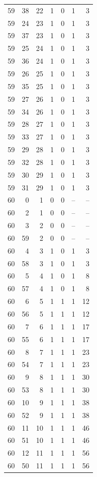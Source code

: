 \begin{longtable}{rrrrrrr}
59 & 38 & 22 & 1 & 0 & 1 & 3\\
59 & 24 & 23 & 1 & 0 & 1 & 3\\
59 & 37 & 23 & 1 & 0 & 1 & 3\\
59 & 25 & 24 & 1 & 0 & 1 & 3\\
59 & 36 & 24 & 1 & 0 & 1 & 3\\
59 & 26 & 25 & 1 & 0 & 1 & 3\\
59 & 35 & 25 & 1 & 0 & 1 & 3\\
59 & 27 & 26 & 1 & 0 & 1 & 3\\
59 & 34 & 26 & 1 & 0 & 1 & 3\\
59 & 28 & 27 & 1 & 0 & 1 & 3\\
59 & 33 & 27 & 1 & 0 & 1 & 3\\
59 & 29 & 28 & 1 & 0 & 1 & 3\\
59 & 32 & 28 & 1 & 0 & 1 & 3\\
59 & 30 & 29 & 1 & 0 & 1 & 3\\
59 & 31 & 29 & 1 & 0 & 1 & 3\\
60 & 0 & 1 & 0 & 0 & -- & --\\
60 & 2 & 1 & 0 & 0 & -- & --\\
60 & 3 & 2 & 0 & 0 & -- & --\\
60 & 59 & 2 & 0 & 0 & -- & --\\
60 & 4 & 3 & 1 & 0 & 1 & 3\\
60 & 58 & 3 & 1 & 0 & 1 & 3\\
60 & 5 & 4 & 1 & 0 & 1 & 8\\
60 & 57 & 4 & 1 & 0 & 1 & 8\\
60 & 6 & 5 & 1 & 1 & 1 & 12\\
60 & 56 & 5 & 1 & 1 & 1 & 12\\
60 & 7 & 6 & 1 & 1 & 1 & 17\\
60 & 55 & 6 & 1 & 1 & 1 & 17\\
60 & 8 & 7 & 1 & 1 & 1 & 23\\
60 & 54 & 7 & 1 & 1 & 1 & 23\\
60 & 9 & 8 & 1 & 1 & 1 & 30\\
60 & 53 & 8 & 1 & 1 & 1 & 30\\
60 & 10 & 9 & 1 & 1 & 1 & 38\\
60 & 52 & 9 & 1 & 1 & 1 & 38\\
60 & 11 & 10 & 1 & 1 & 1 & 46\\
60 & 51 & 10 & 1 & 1 & 1 & 46\\
60 & 12 & 11 & 1 & 1 & 1 & 56\\
60 & 50 & 11 & 1 & 1 & 1 & 56\\

\end{longtable}
